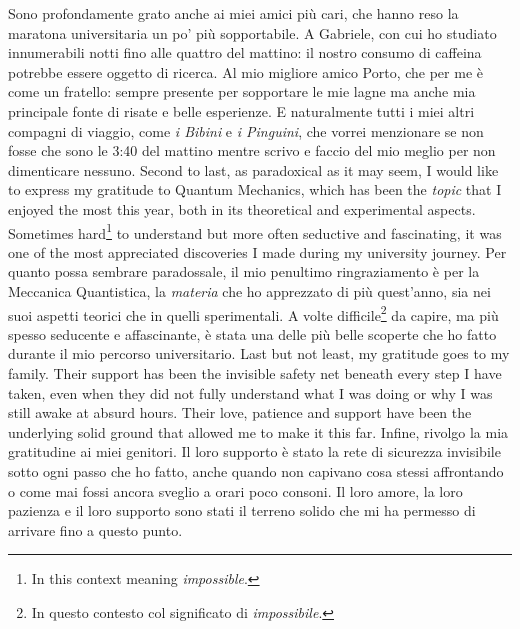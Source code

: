 \begin{paracol}{2}
    \switchcolumn
    Sono profondamente grato anche ai miei amici più cari, che hanno reso la maratona universitaria un po' più sopportabile. A Gabriele, con cui ho studiato innumerabili notti fino alle quattro del mattino: il nostro consumo di caffeina potrebbe essere oggetto di ricerca. Al mio migliore amico Porto, che per me è come un fratello: sempre presente per sopportare le mie lagne ma anche mia principale fonte di risate e belle esperienze. E naturalmente tutti i miei altri compagni di viaggio, come \emph{i Bibini} e \emph{i Pinguini}, che vorrei menzionare se non fosse che sono le 3:40 del mattino mentre scrivo e faccio del mio meglio per non dimenticare nessuno.
    \switchcolumn*
    Second to last, as paradoxical as it may seem, I would like to express my gratitude to Quantum Mechanics, which has been the \emph{topic} that I enjoyed the most this year, both in its theoretical and experimental aspects. Sometimes hard\footnote{In this context meaning \emph{impossible}.} to understand but more often seductive and fascinating, it was one of the most appreciated discoveries I made during my university journey.
    \switchcolumn
    Per quanto possa sembrare paradossale, il mio penultimo ringraziamento è per la Meccanica Quantistica, la \emph{materia} che ho apprezzato di più quest'anno, sia nei suoi aspetti teorici che in quelli sperimentali. A volte difficile\footnote{In questo contesto col significato di \emph{impossibile}.} da capire, ma più spesso seducente e affascinante, è stata una delle più belle scoperte che ho fatto durante il mio percorso universitario.
    \switchcolumn*
    Last but not least, my gratitude goes to my family. Their support has been the invisible safety net beneath every step I have taken, even when they did not fully understand what I was doing or why I was still awake at absurd hours. Their love, patience and support have been the underlying solid ground that allowed me to make it this far.
    \switchcolumn
    Infine, rivolgo la mia gratitudine ai miei genitori. Il loro supporto è stato la rete di sicurezza invisibile sotto ogni passo che ho fatto, anche quando non capivano cosa stessi affrontando o come mai fossi ancora sveglio a orari poco consoni. Il loro amore, la loro pazienza e il loro supporto sono stati il terreno solido che mi ha permesso di arrivare fino a questo punto.
\end{paracol}